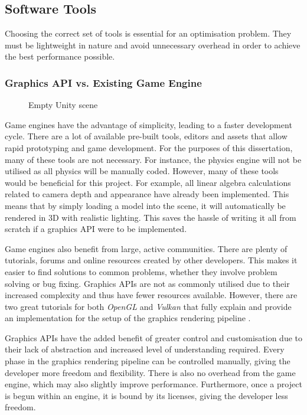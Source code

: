 \documentclass[a4paper, 12pt]{article}
\newcommand{\wideimage}[2][]{%
  \makebox[\textwidth][c]{\texttt{[image: \#2]}}%
}
\begin{document}
    \subsection{Software Tools}

    Choosing the correct set of tools is essential for an optimisation problem. They must be lightweight in nature and avoid unnecessary overhead in order to achieve the best performance possible.

    \subsubsection{Graphics API vs. Existing Game Engine}

    \begin{figure}[H]
        \wideimage[]{unityInterface.png}
        \caption{Empty Unity\cite{unity} scene}
    \end{figure}

    Game engines have the advantage of simplicity, leading to a faster development cycle. There are a lot of available pre-built tools, editors and assets that allow rapid prototyping and game development. For the purposes of this dissertation, many of these tools are not necessary. For instance, the physics engine will not be utilised as all physics will be manually coded. However, many of these tools would be beneficial for this project. For example, all linear algebra calculations related to camera depth and appearance have already been implemented. This means that by simply loading a model into the scene, it will automatically be rendered in 3D with realistic lighting. This saves the hassle of writing it all from scratch if a graphics API were to be implemented.

    Game engines also benefit from large, active communities. There are plenty of tutorials, forums and online resources created by other developers. This makes it easier to find solutions to common problems, whether they involve problem solving or bug fixing. Graphics APIs are not as commonly utilised due to their increased complexity and thus have fewer resources available. However, there are two great tutorials for both \textit{OpenGL} and \textit{Vulkan}\cite{vulkan} that fully explain and provide an implementation for the setup of the graphics rendering pipeline \cite{learnopengl}\cite{vulkantutorial}.

    Graphics APIs have the added benefit of greater control and customisation due to their lack of abstraction and increased level of understanding required. Every phase in the graphics rendering pipeline can be controlled manually, giving the developer more freedom and flexibility. There is also no overhead from the game engine, which may also slightly improve performance. Furthermore, once a project is begun within an engine, it is bound by its licenses, giving the developer less freedom.
\end{document}
